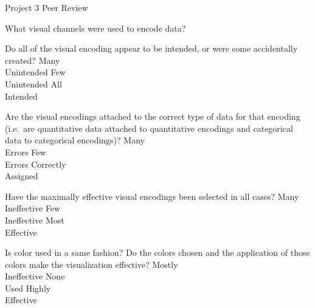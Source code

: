 \documentclass[a4paper,12pt]{article}
\begin{document}
\begin{center}
{\huge Project 3 Peer Review}
\end{center}





	{What visual channels were used to encode data? }
    { 
    }
        
	{Do all of the visual encoding appear to be intended, or were some accidentally created?}
        {\choice Many\\Unintended}
        {\choice Few\\Unintended}
        {\choice All\\Intended} 
        
	{Are the visual encodings attached to the correct type of data for that 
    	encoding (i.e.\ are quantitative data attached to quantitative 
        encodings and categorical data to categorical encodings)?}
    {\choice Many\\Errors}
    {\choice Few\\Errors}
    {\choice Correctly\\Assigned} 
            
	{Have the maximally effective visual encodings been selected in all cases? }
    {\choice Many\\Ineffective}
    {\choice Few\\Ineffective}
    {\choice Most\\Effective} 
        
	{Is color used in a same fashion? Do the colors chosen and the application 
    	of those colors make the visualization effective?}
    {\choice Mostly\\Ineffective}
    {\choice None\\Used}
    {\choice Highly\\Effective} 
\end{document}
